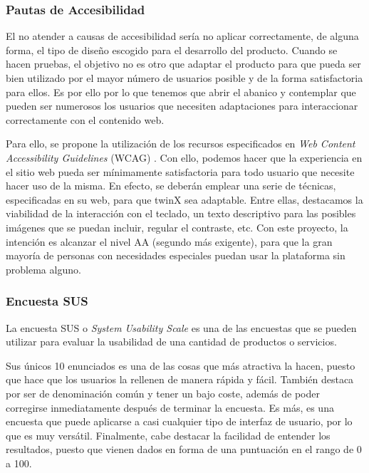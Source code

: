 \subsubsection{Pautas de Accesibilidad}

El no atender a causas de accesibilidad sería no aplicar correctamente, de alguna forma, el tipo de diseño escogido para el desarrollo del producto. Cuando se hacen pruebas, el objetivo no es otro que adaptar el producto para que pueda ser bien utilizado por el mayor número de usuarios posible y de la forma satisfactoria para ellos. Es por ello por lo que tenemos que abrir el abanico y contemplar que pueden ser numerosos los usuarios que necesiten adaptaciones para interaccionar correctamente con el contenido web.

Para ello, se propone la utilización de los recursos especificados en \textit{Web Content Accessibility Guidelines} (WCAG) \cite{wcag}. Con ello, podemos hacer que la experiencia en el sitio web pueda ser mínimamente satisfactoria para todo usuario que necesite hacer uso de la misma. En efecto, se deberán emplear una serie de técnicas, especificadas en su web, para que twinX sea adaptable. Entre ellas, destacamos la viabilidad de la interacción con el teclado, un texto descriptivo para las posibles imágenes que se puedan incluir, regular el contraste, etc. Con este proyecto, la intención es alcanzar el nivel AA (segundo más exigente), para que la gran mayoría de personas con necesidades especiales puedan usar la plataforma sin problema alguno.

\subsubsection{Encuesta SUS}

La encuesta SUS o \textit{System Usability Scale} es una de las encuestas que se pueden utilizar para evaluar la usabilidad de una cantidad de productos o servicios.

Sus únicos 10 enunciados es una de las cosas que más atractiva la hacen, puesto que hace que los usuarios la rellenen de manera rápida y fácil. También destaca por ser de denominación común y tener un bajo coste, además de poder corregirse inmediatamente después de terminar la encuesta. Es más, es una encuesta que puede aplicarse a casi cualquier tipo de interfaz de usuario, por lo que es muy versátil. Finalmente, cabe destacar la facilidad de entender los resultados, puesto que vienen dados en forma de una puntuación en el rango de 0 a 100.

